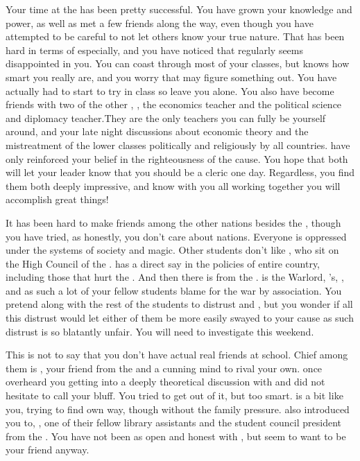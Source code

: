 \documentclass[char]{GL2020}
\begin{document}
Your time at the \pSc{} has been pretty successful. You have grown your knowledge and power, as well as met a few friends along the way, even though you have attempted to be careful to not let others know your true nature. That has been hard in terms of \cHistory{} especially, and you have noticed that \cHistory{\they} regularly seems disappointed in you. You can coast through most of your classes, but \cHistory{\they} knows how smart you really are, and you worry that \cHistory{\they} may figure something out. You have actually had to start to try in \cHistory{\their} class so \cHistory{\they} leave you alone. You also have become friends with two of the other \pGoaties{}, \cChupSecond{\full}, the economics teacher and \ChupInventor{\full} the political science and diplomacy teacher.They are the only teachers you can fully be yourself around, and your late night discussions about economic theory and the mistreatment of the lower classes politically and religiously by all countries. have only reinforced your belief in the righteousness of the cause. You hope that both  will let your leader know that you should be a cleric one day. Regardless, you find them both deeply impressive, and know with you all working together you will accomplish great things!

 It has been hard to make friends among the other nations besides the \pFarm{}, though you have tried, as honestly, you don’t care about nations.  Everyone is oppressed under the systems of society and magic. Other students don’t like  \cTechStar{}, who sit\cTechStar{\verbs} on the High Council of the \pTech{}. \cTechStar{} has a direct say in the policies of \cTechStar{\their} entire country, including those that hurt the \pFarm{}. And then there is \cWarlordDaughter{\full} from the \pShip{}. \cWarlordDaughter{} is the \pShippie{} Warlord, \cLoud{\full}'s, \cWarlordDaughter{\offspring}, and as such a lot of your fellow students blame \cWarlordDaughter{\them} for the war by association. You pretend along with the rest of the \pFarm{} students to distrust \cTechStar{} and  \cWarlordDaughter{}, but you wonder if all this distrust would let either of them  be more easily swayed to your cause as such distrust is so blatantly unfair. You will need to investigate this weekend.

This is not to say that you don’t have actual real friends at school. Chief among them is \cAmbition{\full}, your friend from the \pTech{} and a cunning mind to rival your own. \cAmbition{} once overheard you getting into a deeply theoretical discussion with \cChupSecond{} and did not hesitate to call your bluff. You tried to get out of it, but \cAmbition{\they} \cAmbition{\were} too smart.  \cAmbition{} is a bit like you, trying to find \cAmbition{\their} own way, though without the family pressure.  \cAmbition{} also introduced you to, , one of their fellow library assistants and the student council president from the \pShip{}. You have not been as open and honest with \cPresident{}, but \cPresident{\they} seem\cPresident{\verbs} to want to be your friend anyway.  
\end{document}
